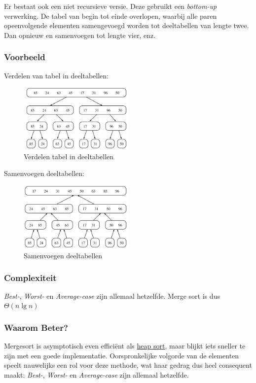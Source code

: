 \documentclass{article}
\begin{document}
Er bestaat ook een niet recursieve versie. Deze gebruikt een \textit{bottom-up} verwerking. De tabel van begin tot einde overlopen, waarbij alle paren opeenvolgende elementen samengevoegd worden tot deeltabellen van lengte twee. Dan opnieuw en samenvoegen tot lengte vier, enz.

\subsubsection{Voorbeeld} %
\label{sub:merge_sort_voorbeeld}
Verdelen van tabel in deeltabellen:
\begin{figure}[h]
	\centering
	\includegraphics[width=0.5\textwidth]{merge_sort_divide}
	\caption{Verdelen tabel in deeltabellen}
	\label{fig:merge_sort_divide}
\end{figure}

Samenvoegen deeltabellen:
\begin{figure}[h]
	\centering
	\includegraphics[width=0.5\textwidth]{merge_sort_merge}
	\caption{Samenvoegen deeltabellen}
	\label{fig:merge_sort_merge}
\end{figure}

\subsubsection{Complexiteit} %
\label{sub:merge_sort_complexiteit}
\textit{Best-}, \textit{Worst-} en \textit{Average-case} zijn allemaal hetzelfde. Merge sort is dus $\Theta(n\lg n)$


\subsubsection{Waarom Beter?} %
\label{sub:merge_sort_waarom_beter}
Mergesort is asymptotisch even efficiënt als \hyperref[sub:heap_sort]{heap sort}, maar blijkt iets sneller te zijn met een goede implementatie. Oorspronkelijke volgorde van de elementen speelt nauwelijks een rol voor deze methode, wat haar gedrag dus heel consequent maakt: \textit{Best-}, \textit{Worst-} en \textit{Average-case} zijn allemaal hetzelfde.
\end{document}
